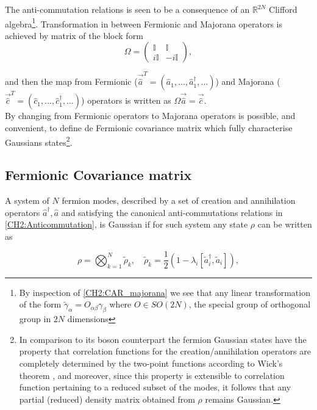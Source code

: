 The anti-commutation relations is seen to be a consequence of an $\mathbb{R}^{2N}$ Clifford algebra\footnote{By inspection of \eqref{CH2:CAR_majorana} we see that  any linear transformation of the form $\tilde{\gamma}_{\alpha} = O_{\alpha\beta}\gamma_{\beta}$ where $O\in SO(2N)$, the special group of orthogonal group in $2N$  dimensions}. Transformation in between Fermionic and Majorana operators is achieved by matrix of the block form
\begin{equation}
\Omega=\left(\begin{array}{cc}
\mathbb{I} & \mathbb{I} \\
i \mathbb{I} & -i \mathbb{I}
\end{array}\right),
\end{equation}

and then the map from Fermionic ($\vec{\hat{a}}^{T} = (\hat{a}_1,\ldots,\hat{a}_1^{\dagger},\ldots)$) and Majorana ($\vec{\hat{c}}^{T} = (\hat{c}_1,\ldots,\hat{c}_1^{\dagger},\ldots)$) operators is written as $\Omega\vec{\hat{a}}=\vec{\hat{c}}$.
\\
By changing from Fermionic operators to Majorana operators is possible, and convenient, to define de Fermionic covariance matrix which fully characterise Gaussians states\footnote{In comparison to its boson counterpart the fermion Gaussian states have the property that correlation functions for the creation/annihilation operators are completely determined by the two-point functions according to Wick’s theorem \cite{westwanski_general_1973}, and moreover,  since this property is extensible to correlation function pertaining to a reduced subset of the modes, it follows that any partial (reduced) density matrix obtained from $\rho$ remains Gaussian.}.
\subsection*{Fermionic Covariance matrix }
A system of $N$ fermion modes, described by a set of creation and annihilation operators $\hat{a}^{\dagger}, \hat{a}$  and satisfying the  canonical anti-commutations relations in \eqref{CH2:Anticommutation}, is Gaussian if for such system any state $\rho$ can be written as  \cite{cheong_many-body_2003}

\begin{equation}
\rho=\bigotimes_{k=1}^{N} \tilde{\rho}_{k}, \quad \tilde{\rho}_{k}=\frac{1}{2}\left(1-\lambda_{i}\left[\tilde{a}_{i}^{\dagger}, \tilde{a}_{i}\right]\right),
\label{CH2:rho_gaussiano_no_exp}
\end{equation}

